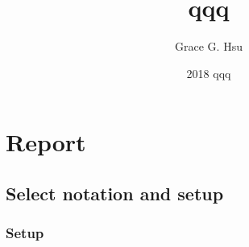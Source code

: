 \documentclass{sfuthesis}
\title{qqq}
\author{Grace G. Hsu}
\date{2018 qqq}
\begin{document}
\raggedright

\frontmatter
\maketitle{}
\makecommittee{}


%
%
%
%

%
\tableofcontents%
\clearpage

%





%
%

\mainmatter%



\chapter{Report}

\section{Select notation and setup}

\subsection{Setup}
\end{document}
